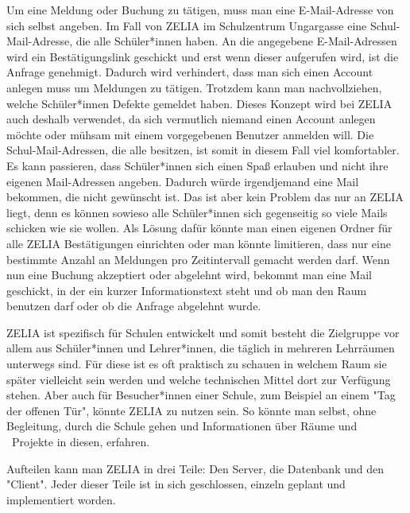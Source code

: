 Um eine Meldung oder Buchung zu tätigen, muss man eine E-Mail-Adresse von sich selbst angeben. Im Fall von ZELIA im Schulzentrum Ungargasse eine Schul-Mail-Adresse, die alle Schüler*innen haben. An die angegebene E-Mail-Adressen wird ein Bestätigungslink geschickt und erst wenn dieser aufgerufen wird, ist die Anfrage genehmigt. Dadurch wird verhindert, dass man sich einen Account anlegen muss um Meldungen zu tätigen. Trotzdem kann man nachvollziehen, welche Schüler*innen Defekte gemeldet haben. Dieses Konzept wird bei ZELIA auch deshalb verwendet, da sich vermutlich niemand einen Account anlegen möchte oder mühsam mit einem vorgegebenen Benutzer anmelden will. Die Schul-Mail-Adressen, die alle besitzen, ist somit in diesem Fall viel komfortabler. Es kann passieren, dass Schüler*innen sich einen Spaß erlauben und nicht ihre eigenen Mail-Adressen angeben. Dadurch würde irgendjemand eine Mail bekommen, die nicht gewünscht ist. Das ist aber kein Problem das nur an ZELIA liegt, denn es können sowieso alle Schüler*innen sich gegenseitig so viele Mails schicken wie sie wollen. Als Lösung dafür könnte man einen eigenen Ordner für alle ZELIA Bestätigungen einrichten oder man könnte limitieren, dass nur eine bestimmte Anzahl an Meldungen pro Zeitintervall gemacht werden darf. Wenn nun eine Buchung akzeptiert oder abgelehnt wird, bekommt man eine Mail geschickt, in der ein kurzer Informationstext steht und ob man den Raum benutzen darf oder ob die Anfrage abgelehnt wurde.

ZELIA ist spezifisch für Schulen entwickelt und somit besteht die Zielgruppe vor allem aus Schüler*innen und Lehrer*innen, die täglich in mehreren Lehrräumen unterwegs sind. Für diese ist es oft praktisch zu schauen in welchem Raum sie später vielleicht sein werden und welche technischen Mittel dort zur Verfügung stehen. Aber auch für Besucher*innen einer Schule, zum Beispiel an einem "Tag der offenen Tür", könnte ZELIA zu nutzen sein. So könnte man selbst, ohne Begleitung, durch die Schule gehen und Informationen über Räume und \zb\ Projekte in diesen, erfahren.

Aufteilen kann man ZELIA in drei Teile: Den Server, die Datenbank und den "Client". Jeder dieser Teile ist in sich geschlossen, einzeln geplant und implementiert worden.

